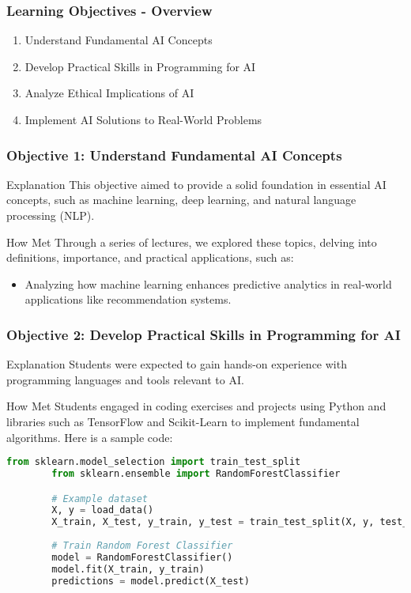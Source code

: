 \documentclass[aspectratio=169]{beamer}
\begin{document}
\begin{frame}[fragile]
    \frametitle{Learning Objectives - Overview}
    \begin{enumerate}
        \item Understand Fundamental AI Concepts
        \item Develop Practical Skills in Programming for AI
        \item Analyze Ethical Implications of AI
        \item Implement AI Solutions to Real-World Problems
    \end{enumerate}
\end{frame}

\begin{frame}[fragile]
    \frametitle{Objective 1: Understand Fundamental AI Concepts}
    \begin{block}{Explanation}
        This objective aimed to provide a solid foundation in essential AI concepts, such as machine learning, deep learning, and natural language processing (NLP).
    \end{block}
    \begin{block}{How Met}
        Through a series of lectures, we explored these topics, delving into definitions, importance, and practical applications, such as:
        \begin{itemize}
            \item Analyzing how machine learning enhances predictive analytics in real-world applications like recommendation systems.
        \end{itemize}
    \end{block}
\end{frame}

\begin{frame}[fragile]
    \frametitle{Objective 2: Develop Practical Skills in Programming for AI}
    \begin{block}{Explanation}
        Students were expected to gain hands-on experience with programming languages and tools relevant to AI.
    \end{block}
    \begin{block}{How Met}
        Students engaged in coding exercises and projects using Python and libraries such as TensorFlow and Scikit-Learn to implement fundamental algorithms.
        Here is a sample code:
        \begin{lstlisting}[language=Python]
        from sklearn.model_selection import train_test_split
        from sklearn.ensemble import RandomForestClassifier

        # Example dataset
        X, y = load_data()
        X_train, X_test, y_train, y_test = train_test_split(X, y, test_size=0.3)
        
        # Train Random Forest Classifier
        model = RandomForestClassifier()
        model.fit(X_train, y_train)
        predictions = model.predict(X_test)
        \end{lstlisting}
    \end{block}
\end{frame}
\end{document}
